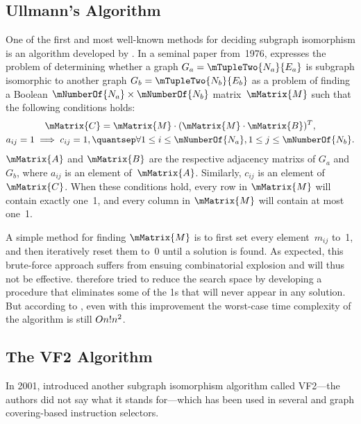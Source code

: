 \subsection{Ullmann's Algorithm}

One of the first and most well-known methods for deciding \gls{subgraph
  isomorphism} is an algorithm developed by \textcite{Ullmann1976}.
%
In a seminal
paper from~1976, \citeauthor{Ullmann1976} expresses the problem of determining
whether a \gls{graph} \mbox{$G_a = \mTupleTwo{N_a}{E_a}$} is \gls{subgraph}
\gls{isomorphic} to another \gls{graph} \mbox{$G_b = \mTupleTwo{N_b}{E_b}$} as a
problem of finding a Boolean \mbox{$\mNumberOf{N_a} \times \mNumberOf{N_b}$}
matrix~$\mMatrix{M}$ such that the following conditions holds:
\begin{gather*}
  \mMatrix{C} = \mMatrix{M} \cdot (\mMatrix{M} \cdot \mMatrix{B})^T,\\
  a_{ij} = 1 \implies c_{ij} = 1,
  \quantsep
  \forall 1 \leq i \leq \mNumberOf{N_a}, 1 \leq j \leq \mNumberOf{N_b}.
\end{gather*}
$\mMatrix{A}$ and $\mMatrix{B}$ are the respective \glspl{adjacency matrix} of
$G_a$ and~$G_b$, where $a_{ij}$ is an element of~$\mMatrix{A}$.
%
Similarly,
$c_{ij}$ is an element of~$\mMatrix{C}$.
%
When these conditions hold, every row
in $\mMatrix{M}$ will contain exactly one~1, and every column in $\mMatrix{M}$
will contain at most one~1.

A simple method for finding $\mMatrix{M}$ is to first set every element~$m_{ij}$
to~1, and then iteratively reset them to~0 until a solution is found.
%
As
expected, this brute-force approach suffers from ensuing combinatorial explosion
and will thus not be effective.
%
\citeauthor{Ullmann1976} therefore tried to
reduce the search space by developing a procedure that eliminates some of the 1s
that will never appear in any solution.
%
But according to
\textcite{Cordella2001}, even with this improvement the worst-case time
complexity of the algorithm is still \mbox{$O{n!n^2}$}.

\subsection{The VF2 Algorithm}

In 2001, \textcite{Cordella2001} introduced another \gls{subgraph isomorphism}
algorithm called \gls{VF2}---the authors did not say what it stands for---which
has been used in several  and \gls{graph covering}-based
instruction selectors.

